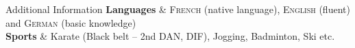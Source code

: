 % 
%
%

\begin{rubriquetableau}[\offsetintab]{Additional Information}
    \textbf{Languages}
    & \textsc{French} (native language), \textsc{English}
    (fluent) and \textsc{German} (basic knowledge)
    \\
    \textbf{Sports}
    & Karate (Black belt -- {\small 2nd DAN}, \acf{DIF}), Jogging, Badminton, Ski
    etc.
    \\
\end{rubriquetableau}

% 
